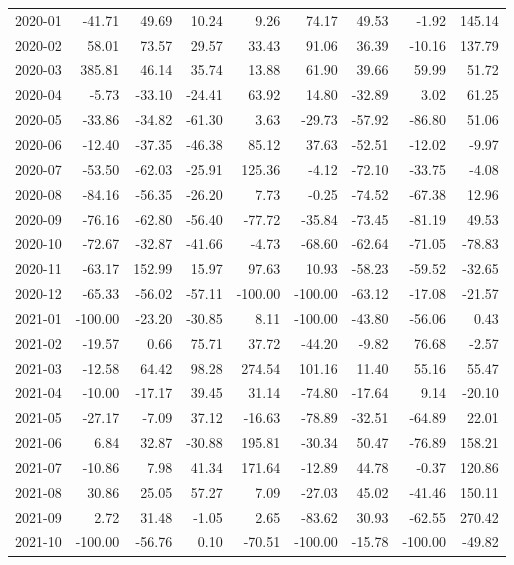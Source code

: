 \begin{table}[ht]
\begin{tabular}{lrrrrrrrr}
  2020-01 & -41.71 & 49.69 & 10.24 & 9.26 & 74.17 & 49.53 & -1.92 & 145.14 \\ 
  2020-02 & 58.01 & 73.57 & 29.57 & 33.43 & 91.06 & 36.39 & -10.16 & 137.79 \\ 
  2020-03 & 385.81 & 46.14 & 35.74 & 13.88 & 61.90 & 39.66 & 59.99 & 51.72 \\ 
  2020-04 & -5.73 & -33.10 & -24.41 & 63.92 & 14.80 & -32.89 & 3.02 & 61.25 \\ 
  2020-05 & -33.86 & -34.82 & -61.30 & 3.63 & -29.73 & -57.92 & -86.80 & 51.06 \\ 
  2020-06 & -12.40 & -37.35 & -46.38 & 85.12 & 37.63 & -52.51 & -12.02 & -9.97 \\ 
  2020-07 & -53.50 & -62.03 & -25.91 & 125.36 & -4.12 & -72.10 & -33.75 & -4.08 \\ 
  2020-08 & -84.16 & -56.35 & -26.20 & 7.73 & -0.25 & -74.52 & -67.38 & 12.96 \\ 
  2020-09 & -76.16 & -62.80 & -56.40 & -77.72 & -35.84 & -73.45 & -81.19 & 49.53 \\ 
  2020-10 & -72.67 & -32.87 & -41.66 & -4.73 & -68.60 & -62.64 & -71.05 & -78.83 \\ 
  2020-11 & -63.17 & 152.99 & 15.97 & 97.63 & 10.93 & -58.23 & -59.52 & -32.65 \\ 
  2020-12 & -65.33 & -56.02 & -57.11 & -100.00 & -100.00 & -63.12 & -17.08 & -21.57 \\ 
  2021-01 & -100.00 & -23.20 & -30.85 & 8.11 & -100.00 & -43.80 & -56.06 & 0.43 \\ 
  2021-02 & -19.57 & 0.66 & 75.71 & 37.72 & -44.20 & -9.82 & 76.68 & -2.57 \\ 
  2021-03 & -12.58 & 64.42 & 98.28 & 274.54 & 101.16 & 11.40 & 55.16 & 55.47 \\ 
  2021-04 & -10.00 & -17.17 & 39.45 & 31.14 & -74.80 & -17.64 & 9.14 & -20.10 \\ 
  2021-05 & -27.17 & -7.09 & 37.12 & -16.63 & -78.89 & -32.51 & -64.89 & 22.01 \\ 
  2021-06 & 6.84 & 32.87 & -30.88 & 195.81 & -30.34 & 50.47 & -76.89 & 158.21 \\ 
  2021-07 & -10.86 & 7.98 & 41.34 & 171.64 & -12.89 & 44.78 & -0.37 & 120.86 \\ 
  2021-08 & 30.86 & 25.05 & 57.27 & 7.09 & -27.03 & 45.02 & -41.46 & 150.11 \\ 
  2021-09 & 2.72 & 31.48 & -1.05 & 2.65 & -83.62 & 30.93 & -62.55 & 270.42 \\ 
  2021-10 & -100.00 & -56.76 & 0.10 & -70.51 & -100.00 & -15.78 & -100.00 & -49.82 \\ 

\end{tabular}
\end{table}
